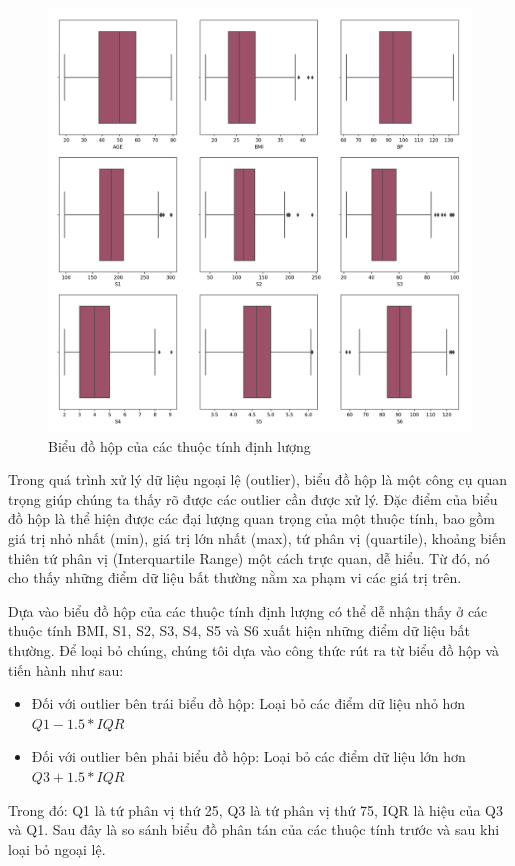 \documentclass[runningheads]{llncs}
\begin{document}
\begin{figure}[H]
\centering
\includegraphics[width=\textwidth]{box}
\caption{Biểu đồ hộp của các thuộc tính định lượng} \label{fig2}
\end{figure}

Trong quá trình xử lý dữ liệu ngoại lệ (outlier), biểu đồ hộp là một công cụ quan trọng giúp chúng ta thấy rõ được các outlier cần được xử lý. Đặc điểm của biểu đồ hộp là thể hiện được các đại lượng quan trọng của một thuộc tính, bao gồm giá trị nhỏ nhất (min), giá trị lớn nhất (max), tứ phân vị (quartile), khoảng biến thiên tứ phân vị (Interquartile Range) một cách trực quan, dễ hiểu. Từ đó, nó cho thấy những điểm dữ liệu bất thường nằm xa phạm vi các giá trị trên.

Dựa vào biểu đồ hộp của các thuộc tính định lượng có thể dễ nhận thấy ở các thuộc tính BMI, S1, S2, S3, S4, S5 và S6 xuất hiện những điểm dữ liệu bất thường. Để loại bỏ chúng, chúng tôi dựa vào công thức rút ra từ biểu đồ hộp và tiến hành như sau:
\begin{itemize}
\item Đối với outlier bên trái biểu đồ hộp: Loại bỏ các điểm dữ liệu nhỏ hơn $Q1-1.5*IQR$
\item Đối với outlier bên phải biểu đồ hộp: Loại bỏ các điểm dữ liệu lớn hơn $Q3+1.5*IQR$
\end{itemize}
Trong đó: Q1 là tứ phân vị thứ 25, Q3 là tứ phân vị thứ 75, IQR là hiệu của Q3 và Q1. Sau đây là so sánh biểu đồ phân tán của các thuộc tính trước và sau khi loại bỏ ngoại lệ.
\end{document}
